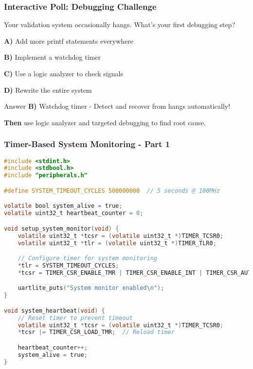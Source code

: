 \documentclass{beamer}
\begin{document}
\begin{frame}
\frametitle{Interactive Poll: Debugging Challenge}
\begin{center}
\Large Your validation system occasionally hangs. What's your first debugging step?
\end{center}

\textbf{A)} Add more printf statements everywhere

\textbf{B)} Implement a watchdog timer

\textbf{C)} Use a logic analyzer to check signals

\textbf{D)} Rewrite the entire system

\pause

\begin{alertblock}{Answer}
\textbf{B)} Watchdog timer - Detect and recover from hangs automatically!
\end{alertblock}

\vspace{0.5cm}
\textbf{Then} use logic analyzer and targeted debugging to find root cause.
\end{frame}

\begin{frame}[fragile]
\frametitle{Timer-Based System Monitoring - Part 1}
\begin{lstlisting}[language=C, basicstyle=\fontsize{6}{6}\selectfont\ttfamily, backgroundcolor={}]
#include <stdint.h>
#include <stdbool.h>
#include "peripherals.h"

#define SYSTEM_TIMEOUT_CYCLES 500000000  // 5 seconds @ 100MHz

volatile bool system_alive = true;
volatile uint32_t heartbeat_counter = 0;

void setup_system_monitor(void) {
    volatile uint32_t *tcsr = (volatile uint32_t *)TIMER_TCSR0;
    volatile uint32_t *tlr = (volatile uint32_t *)TIMER_TLR0;

    // Configure timer for system monitoring
    *tlr = SYSTEM_TIMEOUT_CYCLES;
    *tcsr = TIMER_CSR_ENABLE_TMR | TIMER_CSR_ENABLE_INT | TIMER_CSR_AUTO_RELOAD;

    uartlite_puts("System monitor enabled\n");
}

void system_heartbeat(void) {
    // Reset timer to prevent timeout
    volatile uint32_t *tcsr = (volatile uint32_t *)TIMER_TCSR0;
    *tcsr |= TIMER_CSR_LOAD_TMR;  // Reload timer

    heartbeat_counter++;
    system_alive = true;
}
\end{lstlisting}
\end{frame}
\end{document}
